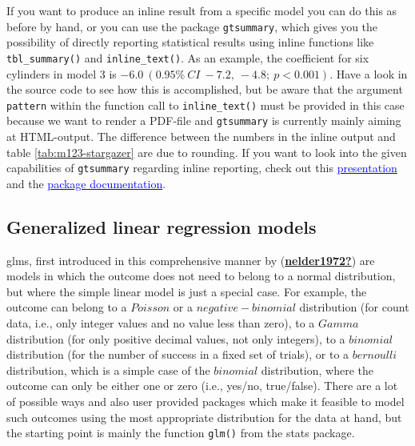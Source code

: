 \documentclass[
  11pt,
  a4paper,
  twoside]{scrbook}
\begin{document}
If you want to produce an inline result from a specific model you can do this as before by hand, or you can use the package \texttt{gtsummary}, which gives you the possibility of directly reporting statistical results using inline functions like \texttt{tbl\_summary()} and \texttt{inline\_text()}. As an example, the coefficient for six cylinders in model 3 is \(-6.0~(0.95\%~CI~-7.2,~-4.8;~p<0.001)\). Have a look in the source code to see how this is accomplished, but be aware that the argument \texttt{pattern} within the function call to \texttt{inline\_text()} must be provided in this case because we want to render a PDF-file and \texttt{gtsummary} is currently mainly aiming at HTML-output. The difference between the numbers in the inline output and table \ref{tab:m123-stargazer} are due to rounding. If you want to look into the given capabilities of \texttt{gtsummary} regarding inline reporting, check out this \href{https://www.danieldsjoberg.com/clinical-reporting-gtsummary-rmed/slides/\#/introduction}{\textcolor{blue}{presentation}} and the \href{https://www.danieldsjoberg.com/gtsummary/}{\textcolor{blue}{package documentation}}.

\hypertarget{generalized-linear-regression-models}{%
\subsection{Generalized linear regression models}\label{generalized-linear-regression-models}}

\Acp{glm}, first introduced in this comprehensive manner by (\protect\hyperlink{ref-nelder1972}{\textbf{nelder1972?}}) are models in which the outcome does not need to belong to a normal distribution, but where the simple linear model is just a special case. For example, the outcome can belong to a \(Poisson\) or a \(negative-binomial\) distribution (for count data, i.e., only integer values and no value less than zero), to a \(Gamma\) distribution (for only positive decimal values, not only integers), to a \(binomial\) distribution (for the number of success in a fixed set of trials), or to a \(bernoulli\) distribution, which is a simple case of the \(binomial\) distribution, where the outcome can only be either one or zero (i.e., yes/no, true/false). There are a lot of possible ways and also user provided packages which make it feasible to model such outcomes using the most appropriate distribution for the data at hand, but the starting point is mainly the function \texttt{glm()} from the stats package.
\end{document}
